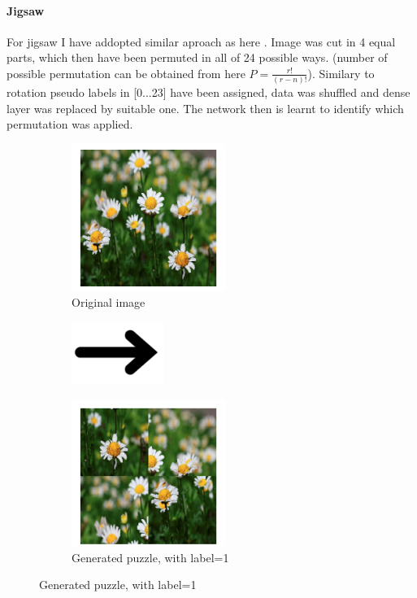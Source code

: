 \paragraph{Jigsaw}
For jigsaw I have addopted similar aproach as here \cite{DBLP:journals/corr/NorooziF16}.
Image was cut in 4 equal parts, which then have been permuted in all of 24 possible ways.
(number of possible permutation can be obtained from here $P=\frac{r!}{(r-n)!}$).
Similary to rotation pseudo labels in [0...23] have been assigned, data was shuffled and dense layer was replaced by suitable one.
The network then is learnt to identify which permutation was applied.

\begin{figure}[!h]
    \begin{subfigure}{0.33\textwidth}
        \caption{Original image}
        \includegraphics[width=5cm]{images/dandelion.png}
    \end{subfigure}
    \begin{subfigure}{0.2\textwidth}
        \includegraphics[width=3cm]{images/arrow.png}
    \end{subfigure}
    \begin{subfigure}{0.33\textwidth}
        \caption{Generated puzzle, with label=1}
        \includegraphics[width=5cm]{images/puzzle.png}
    \end{subfigure}
\end{figure}

